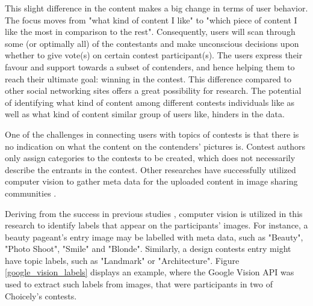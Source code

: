     This slight difference in the content makes a big change in terms of user behavior. The focus moves from "what kind of content I like" to "which piece of content I like the most in comparison to the rest". Consequently, users will scan through some (or optimally all) of the contestants and make unconscious decisions upon whether to give vote(s) on certain contest participant(s). The users express their favour and support towards a subset of contenders, and hence helping them to reach their ultimate goal: winning in the contest. 
    This difference compared to other social networking sites offers a great possibility for research. The potential of identifying what kind of content among different contests individuals like as well as what kind of content similar group of users like, hinders in the data.    

    One of the challenges in connecting users with topics of contests is that there is no indication on what the content on the contenders' pictures is. Contest authors only assign categories to the contests to be created, which does not necessarily describe the entrants in the contest. Other researches have successfully utilized computer vision to gather meta data for the uploaded content in image sharing communities \cite{bakhshi2014faces, hu2014we}. 
    
    Deriving from the success in previous studies \cite{hu2014we, farseev2015harvestingmultiplesources, han2016teensarefrommars, bakhshi2014faces}, computer vision is utilized in this research to identify labels that appear on the participants' images. For instance, a beauty pageant's entry image may be labelled with meta data, such as "Beauty", "Photo Shoot", "Smile" and "Blonde". Similarly, a design contests entry might have topic labels, such as "Landmark" or "Architecture". Figure \ref{google_vision_labels} displays an example, where the Google Vision API was used to extract such labels from images, that were participants in two of Choicely's contests.

